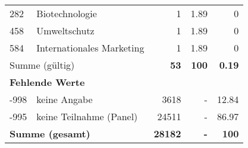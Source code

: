 \begin{longtable}{lXrrr}
        282 & \multicolumn{1}{X}{Biotechnologie} & %
          \num{1} &
          \num[round-mode=places,round-precision=2]{1.89} &
          \num[round-mode=places,round-precision=2]{0} \\

        458 & \multicolumn{1}{X}{Umweltschutz} & %
          \num{1} &
          \num[round-mode=places,round-precision=2]{1.89} &
          \num[round-mode=places,round-precision=2]{0} \\

        584 & \multicolumn{1}{X}{Internationales Marketing} & %
          \num{1} &
          \num[round-mode=places,round-precision=2]{1.89} &
          \num[round-mode=places,round-precision=2]{0} \\

     \midrule
     \multicolumn{2}{l}{Summe (gültig)} &
       \textbf{\num{53}} &
     \textbf{100} &
       \textbf{\num[round-mode=places,round-precision=2]{0.19}} \\
     \multicolumn{5}{l}{\textbf{Fehlende Werte}}\\
       -998 &
       keine Angabe &
         \num{3618} &
        - &
         \num[round-mode=places,round-precision=2]{12.84} \\
       -995 &
       keine Teilnahme (Panel) &
         \num{24511} &
        - &
         \num[round-mode=places,round-precision=2]{86.97} \\
     \midrule
     \multicolumn{2}{l}{\textbf{Summe (gesamt)}} &
          \textbf{\num{28182}} &
        \textbf{-} &
        \textbf{100} \\
     \bottomrule
     \end{longtable}
     
